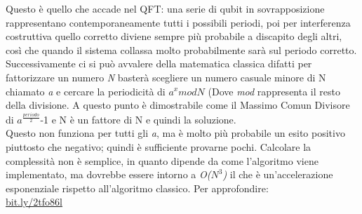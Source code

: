 Questo è quello che accade nel QFT: una serie di qubit in sovrapposizione rappresentano contemporaneamente tutti i possibili periodi, poi per interferenza costruttiva quello corretto diviene sempre più probabile a discapito degli altri, così che quando il sistema collassa molto probabilmente sarà sul periodo corretto.\\
Successivamente ci si può avvalere della matematica classica difatti per fattorizzare un numero \textit{N} basterà scegliere un numero casuale minore di N chiamato \textit{a} e cercare la periodicità di $a^x mod N$ (Dove \textit{mod} rappresenta il resto della divisione. A questo punto è dimostrabile come il Massimo Comun Divisore di $a^\frac{periodo}{2}$-1 e N è un fattore di N e quindi la soluzione.\\
Questo non funziona per tutti gli \textit{a}, ma è molto più probabile un esito positivo piuttosto che negativo; quindi è sufficiente provarne pochi.
Calcolare la complessità non è semplice, in quanto dipende da come l'algoritmo viene implementato, ma dovrebbe essere intorno a \textit{O($N^3$)} il che è un'accelerazione esponenziale rispetto all'algoritmo classico.
Per approfondire:\\
\href{https://bit.ly/2tfo86l}{bit.ly/2tfo86l}